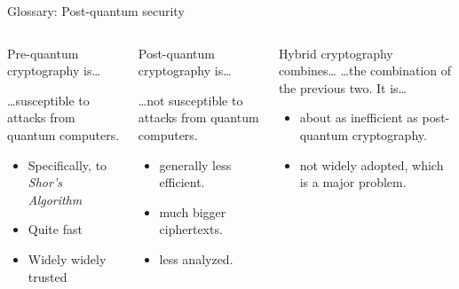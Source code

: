 \begin{frame}[T]{Glossary: Post-quantum security}
\small
  \begin{columns}[t,fullwidth]
    \begin{column}{.30\linewidth}
      \begin{block}{Pre-quantum cryptography is… }

      …susceptible to attacks from quantum computers.

\bigskip
      \begin{itemize}
        \item Specifically, to \emph{Shor's Algorithm} %
        \item Quite fast
        \item Widely widely trusted
      \end{itemize}
      \end{block}
    \end{column}
\hfill
    \begin{column}{.3\linewidth}
      \begin{block}{Post-quantum cryptography is…}

        …not susceptible to attacks from quantum computers.

\bigskip
      \begin{itemize}
        \item generally less efficient.
        \item much bigger ciphertexts.
        \item less analyzed.
      \end{itemize}
      \end{block}
    \end{column}
\hfill
    \begin{column}{.3\linewidth}
      \begin{block}{Hybrid cryptography combines…}
        …the combination of the previous two. It is…

\bigskip
        \begin{itemize}
          \item about as inefficient as post-quantum cryptography.
          \item not widely adopted, which is a major problem.
        \end{itemize}
      \end{block}
    \end{column}
  \end{columns}
\end{frame}





